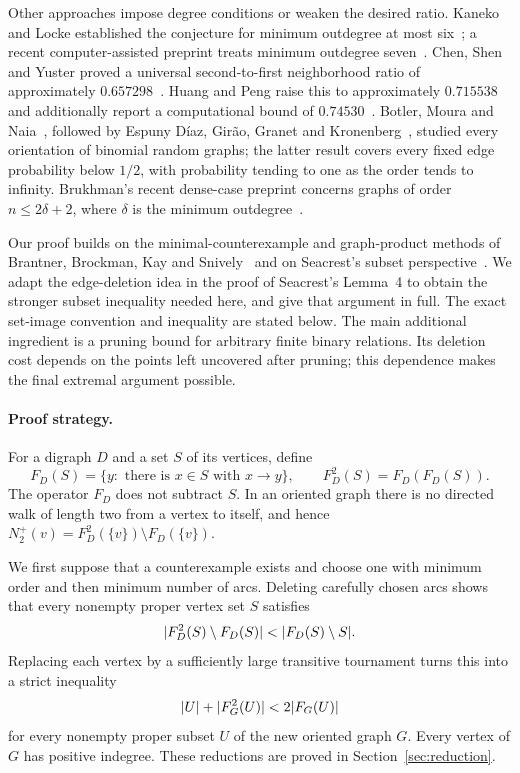 Other approaches impose degree conditions or weaken the desired ratio.
Kaneko and Locke established the conjecture for minimum outdegree at most
six~\cite{KanekoLocke2001}; a recent computer-assisted preprint treats
minimum outdegree seven~\cite{SadhukhanSandeepSen2026}.
Chen, Shen and Yuster proved a universal second-to-first neighborhood
ratio of approximately $0.657298$~\cite{ChenShenYuster2003}.
Huang and Peng raise this to approximately $0.715538$ and additionally
report a computational bound of $0.74530$~\cite{HuangPeng2024}.
Botler, Moura and Naia~\cite{BotlerMouraNaia2023}, followed by
Espuny D\'iaz, Gir\~ao, Granet and Kronenberg~\cite{EspunyDiazEtAl2025},
studied every orientation of binomial random graphs; the latter result
covers every fixed edge probability below $1/2$, with probability tending
to one as the order tends to infinity.  Brukhman's recent dense-case
preprint concerns graphs of order $n\leq 2\delta+2$, where $\delta$ is
the minimum outdegree~\cite{Brukhman2026}.

Our proof builds on the minimal-counterexample and graph-product
methods of Brantner, Brockman, Kay and
Snively~\cite{BrantnerBrockmanKaySnively2009} and on Seacrest's
subset perspective~\cite{Seacrest2019}.
We adapt the edge-deletion idea in the proof of Seacrest's Lemma~4 to
obtain the stronger subset inequality needed here, and give that argument
in full.  The exact set-image convention and inequality are stated below.
The main additional ingredient is a pruning bound for arbitrary finite
binary relations.  Its deletion cost depends on the points left uncovered
after pruning; this dependence makes the final extremal argument possible.

\paragraph{Proof strategy.}
For a digraph \(D\) and a set \(S\) of its vertices, define
\[
 F_D(S)=\{y:\text{ there is }x\in S\text{ with }x\to y\},
 \qquad F_D^2(S)=F_D(F_D(S)).
\]
The operator \(F_D\) does not subtract \(S\).  In an oriented graph there is
no directed walk of length two from a vertex to itself, and hence
\(N_2^+(v)=F_D^2(\{v\})\setminus F_D(\{v\})\).

We first suppose that a counterexample exists and choose one with minimum
order and then minimum number of arcs.  Deleting carefully chosen arcs
shows that every nonempty proper vertex set \(S\) satisfies
\[
 \lvert F_D^2(S)\setminus F_D(S)\rvert
 <
 \lvert F_D(S)\setminus S\rvert.
\]
Replacing each vertex by a sufficiently large transitive tournament turns
this into a strict inequality
\begin{equation}\label{eq:overview-concavity}
 \lvert U\rvert+\lvert F_G^2(U)\rvert<2\lvert F_G(U)\rvert
\end{equation}
for every nonempty proper subset \(U\) of the new oriented graph \(G\).
Every vertex of \(G\) has positive indegree.  These reductions are proved in
Section~\ref{sec:reduction}.

